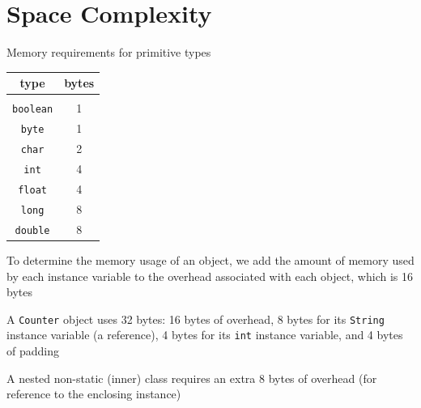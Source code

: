 \documentclass[8pt,a4paper,compress]{beamer}
\begin{document}
\section{Space Complexity}
\begin{frame}[fragile]
Memory requirements for primitive types
\begin{center}
\begin{tabular}{cc}
type & bytes \\ \hline \\
\lstinline$boolean$ & 1 \\
\lstinline$byte$ & 1 \\
\lstinline$char$ & 2 \\
\lstinline$int$ & 4 \\
\lstinline$float$ & 4 \\
\lstinline$long$ & 8 \\
\lstinline$double$ & 8
\end{tabular} 
\end{center}

\bigskip

To determine the memory usage of an object, we add the amount of memory used by each instance variable to the overhead associated with each object, which is 16 bytes

\bigskip

A \lstinline{Counter} object uses 32 bytes: 16 bytes of overhead, 8 bytes for its \lstinline{String} instance variable (a reference), 4 bytes for its \lstinline{int} instance variable, and 4 bytes of padding

\bigskip

A nested non-static (inner) class requires an extra 8 bytes of overhead (for reference to the enclosing instance)
\end{frame}
\end{document}
